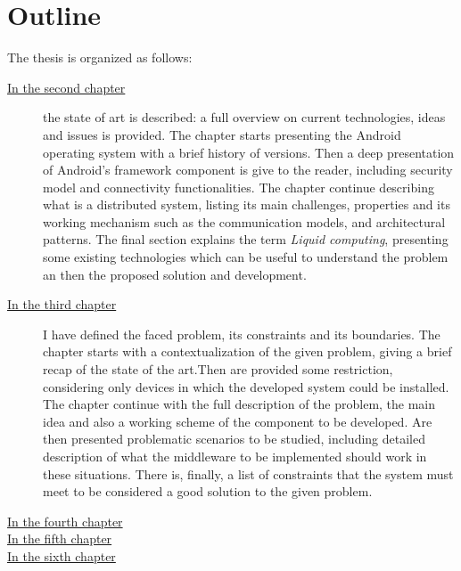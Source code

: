 \section{Outline}
%
\par The thesis is organized as follows:
%
%
\begin{description}
%
\item[{\hyperref[cap:statoarte]{In the second chapter}}] the state of art is described: a full overview on current technologies, ideas and issues is provided. The chapter starts presenting the Android operating system with a brief history of versions. Then a deep presentation of Android's framework component is give to the reader, including security model and connectivity functionalities. The chapter continue describing what is a distributed system, listing its main challenges, properties and its working mechanism such as the communication models, and architectural patterns. The final section explains the term \textit{Liquid computing}, presenting some existing technologies which can be useful to understand the problem an then the proposed solution and development.
%
\item[{\hyperref[cap:probanalysis]{In the third chapter}}] I have defined the faced problem, its constraints and its boundaries. The chapter starts with a contextualization of the given problem, giving a brief recap of the state of the art.Then are provided some restriction, considering only devices in which the developed system could be installed. The chapter continue with the full description of the problem, the main idea and also a working scheme of the component to be developed. Are then presented problematic scenarios to be studied, including detailed description of what the middleware to be implemented should work in these situations. There is, finally, a list of constraints that the system must meet to be considered a good solution to the given problem.

\item[{\hyperref[cap:proposedsolution]{In the fourth chapter}}] 

\item[{\hyperref[cap:proofofconcept]{In the fifth chapter}}]

\item[{\hyperref[cap:conclusions]{In the sixth chapter}}]
%
\end{description}
%
